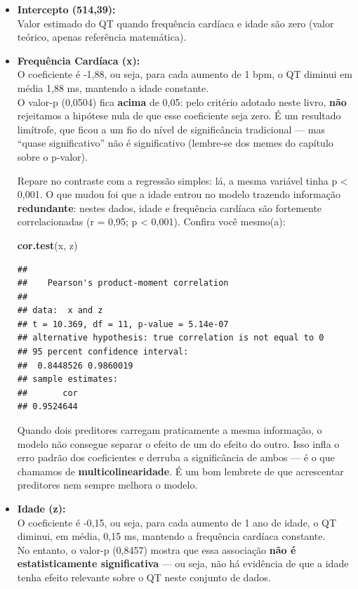 \documentclass[
]{book}
\newenvironment{Shaded}{\begin{snugshade}}{\end{snugshade}}
\newcommand{\FunctionTok}[1]{\textcolor[rgb]{0.13,0.29,0.53}{\textbf{#1}}}
\newcommand{\NormalTok}[1]{#1}
\begin{document}
\begin{itemize}
\item
  \textbf{Intercepto (514,39):}\\
  Valor estimado do QT quando frequência cardíaca e idade são zero (valor teórico, apenas referência matemática).
\item
  \textbf{Frequência Cardíaca (x):}\\
  O coeficiente é -1,88, ou seja, para cada aumento de 1 bpm, o QT diminui em média 1,88 ms, mantendo a idade constante.\\
  O valor-p (0,0504) fica \textbf{acima} de 0,05: pelo critério adotado neste livro, \textbf{não} rejeitamos a hipótese nula de que esse coeficiente seja zero. É um resultado limítrofe, que ficou a um fio do nível de significância tradicional --- mas ``quase significativo'' não é significativo (lembre-se dos memes do capítulo sobre o p-valor).

  Repare no contraste com a regressão simples: lá, a mesma variável tinha p \textless{} 0,001. O que mudou foi que a idade entrou no modelo trazendo informação \textbf{redundante}: nestes dados, idade e frequência cardíaca são fortemente correlacionadas (r = 0,95; p \textless{} 0,001). Confira você mesmo(a):

\begin{Shaded}
\begin{Highlighting}[]
\FunctionTok{cor.test}\NormalTok{(x, z)}
\end{Highlighting}
\end{Shaded}

\begin{verbatim}
## 
##    Pearson's product-moment correlation
## 
## data:  x and z
## t = 10.369, df = 11, p-value = 5.14e-07
## alternative hypothesis: true correlation is not equal to 0
## 95 percent confidence interval:
##  0.8448526 0.9860019
## sample estimates:
##       cor 
## 0.9524644
\end{verbatim}

  Quando dois preditores carregam praticamente a mesma informação, o modelo não consegue separar o efeito de um do efeito do outro. Isso infla o erro padrão dos coeficientes e derruba a significância de ambos --- é o que chamamos de \textbf{multicolinearidade}. É um bom lembrete de que acrescentar preditores nem sempre melhora o modelo.
\item
  \textbf{Idade (z):}\\
  O coeficiente é -0,15, ou seja, para cada aumento de 1 ano de idade, o QT diminui, em média, 0,15 ms, mantendo a frequência cardíaca constante.\\
  No entanto, o valor-p (0,8457) mostra que essa associação \textbf{não é estatisticamente significativa} --- ou seja, não há evidência de que a idade tenha efeito relevante sobre o QT neste conjunto de dados.
\end{itemize}
\end{document}

